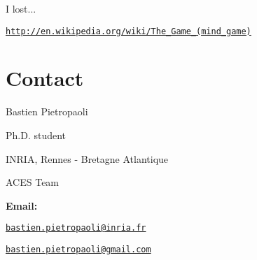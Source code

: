 I lost...

\href{http://en.wikipedia.org/wiki/The_Game_(mind_game)}{\tt http://en.wikipedia.org/wiki/The\_\-Game\_\-(mind\_\-game)}\hypertarget{origin_page_Origin_contact}{}\section{Contact}\label{origin_page_Origin_contact}
Bastien Pietropaoli \par
 Ph.D. student \par
 INRIA, Rennes -\/ Bretagne Atlantique \par
 ACES Team \par


{\bfseries Email:} \par
 \href{mailto:bastien.pietropaoli@inria.fr}{\tt bastien.pietropaoli@inria.fr} \par
 \href{mailto:bastien.pietropaoli@gmail.com}{\tt bastien.pietropaoli@gmail.com} \par
 